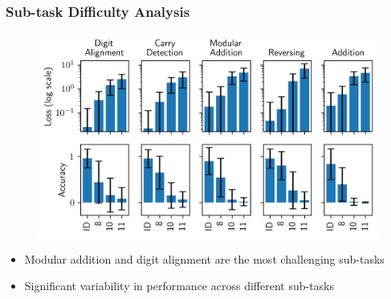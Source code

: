 \documentclass[14pt,aspectratio=169]{beamer}
\theoremstyle{remark}
\begin{document}
\begin{frame}
    \frametitle{Sub-task Difficulty Analysis}
    \begin{figure}
        \centering
        \includegraphics[width=0.7\linewidth]{fig/subtask_difficulty.png}
    \end{figure}
    \begin{itemize}
        \item Modular addition and digit alignment are the most challenging sub-tasks
        \item Significant variability in performance across different sub-tasks
    \end{itemize}
\end{frame}
\end{document}
